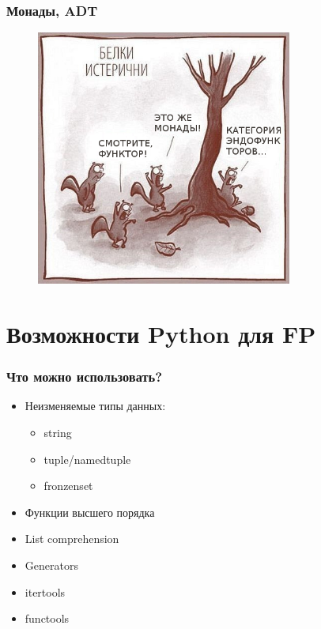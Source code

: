 \documentclass[18pt, compress]{beamer}
\begin{document}
\begin{frame}
    \frametitle{Монады, ADT}
    \vspace{-25pt}
    \begin{figure}
        \includegraphics[width=0.75\textwidth,center]{squirells.png}
    \end{figure}
\end{frame}

\fontsize{13pt}{14}\selectfont
\section{Возможности Python для FP}
\fontsize{17pt}{18}\selectfont

\begin{frame}
    \frametitle{Что можно использовать?}
    \vspace{-25pt}
    \begin{itemize}[label={\MVRightarrow}]
        \item <+->Неизменяемые типы данных:
            \begin{itemize}
                \item string
                \item tuple/namedtuple
                \item fronzenset
            \end{itemize}
        \item <+->Функции высшего порядка
        \item <+->List comprehension
        \item <+->Generators
        \item <+->itertools
        \item <+->functools
    \end{itemize}
\end{frame}
\end{document}
